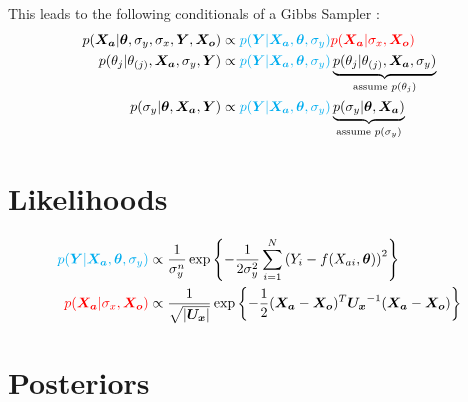 \documentclass[10pt]{article}
\renewcommand{\vec}[1]{\boldsymbol{#1}}
\newcommand{\mat}[1]{\boldsymbol{#1}}
\begin{document}
This leads to the following conditionals of a Gibbs Sampler \cite{dellaportas_1995}:
\begin{align}
    p(\vec{X_a} | \vec{\theta}, \sigma_y, \sigma_x, \vec{Y}, \vec{X_o}) &\propto {\color{cyan} p(\vec{Y} | \vec{X_a}, \vec{\theta}, \sigma_y)} {\color{red} p(\vec{X_a} | \sigma_x, \vec{X_o})} \label{eq:posterior_X_a}\\
    p(\theta_j | \theta_{(j)}, \vec{X_a}, \sigma_y, \vec{Y}) &\propto {\color{cyan} p(\vec{Y} | \vec{X_a}, \vec{\theta}, \sigma_y)} \underbrace{p(\theta_j | \theta_{(j)}, \vec{X_a}, \sigma_{y})}_{\text{assume } p(\theta_j)} \label{eq:posterior_params} \\
    p(\sigma_y | \vec{\theta}, \vec{X_a}, \vec{Y}) &\propto {\color{cyan} p(\vec{Y} | \vec{X_a}, \vec{\theta}, \sigma_y)} \underbrace{p(\sigma_y | \vec{\theta}, \vec{X_a})}_{\text{assume } p(\sigma_y)} \label{eq:posterior_sigma_y}
\end{align}


\section{Likelihoods}
\begin{align}
    {\color{cyan} p(\vec{Y} | \vec{X_a}, \vec{\theta}, \sigma_y)} &\propto \frac{1}{\sigma_y^n} \exp\left\{ - \frac{1}{2\sigma_y^2} \sum_{i=1}^N \left( Y_i - f(X_{ai}, \vec{\theta}) \right)^2 \right\} \\
    {\color{red} p(\vec{X_a} | \sigma_x, \vec{X_o})} &\propto \frac{1}{\sqrt{|\mat{U_x}|}} \exp\left\{ - \frac{1}{2} (\vec{X_a} - \vec{X_o})^T \mat{U_x}^{-1} (\vec{X_a} - \vec{X_o}) \right\}
\end{align}    

\section{Posteriors}
\end{document}
